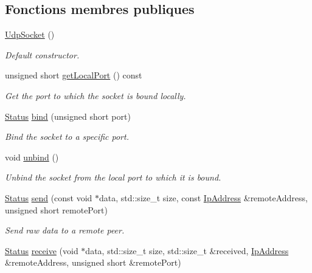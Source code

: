 \subsection*{Fonctions membres publiques}
\begin{DoxyCompactItemize}
\item 
\mbox{\label{classsf_1_1UdpSocket_abb10725e26dee9d3a8165fe87ffb71bb}} 
\hyperlink{classsf_1_1UdpSocket_abb10725e26dee9d3a8165fe87ffb71bb}{Udp\+Socket} ()
\begin{DoxyCompactList}\small\item\em Default constructor. \end{DoxyCompactList}\item 
unsigned short \hyperlink{classsf_1_1UdpSocket_a5c03644b3da34bb763bce93e758c938e}{get\+Local\+Port} () const
\begin{DoxyCompactList}\small\item\em Get the port to which the socket is bound locally. \end{DoxyCompactList}\item 
\hyperlink{classsf_1_1Socket_a51bf0fd51057b98a10fbb866246176dc}{Status} \hyperlink{classsf_1_1UdpSocket_ab0bf8d32849836f92beb2fd734565481}{bind} (unsigned short port)
\begin{DoxyCompactList}\small\item\em Bind the socket to a specific port. \end{DoxyCompactList}\item 
void \hyperlink{classsf_1_1UdpSocket_a2c4abb8102a1bd31f51fcfe7f15427a3}{unbind} ()
\begin{DoxyCompactList}\small\item\em Unbind the socket from the local port to which it is bound. \end{DoxyCompactList}\item 
\hyperlink{classsf_1_1Socket_a51bf0fd51057b98a10fbb866246176dc}{Status} \hyperlink{classsf_1_1UdpSocket_a664ab8f26f37c21cc4de1b847c2efcca}{send} (const void $\ast$data, std\+::size\+\_\+t size, const \hyperlink{classsf_1_1IpAddress}{Ip\+Address} \&remote\+Address, unsigned short remote\+Port)
\begin{DoxyCompactList}\small\item\em Send raw data to a remote peer. \end{DoxyCompactList}\item 
\hyperlink{classsf_1_1Socket_a51bf0fd51057b98a10fbb866246176dc}{Status} \hyperlink{classsf_1_1UdpSocket_ade9ca0f7ed7919136917b0b997a9833a}{receive} (void $\ast$data, std\+::size\+\_\+t size, std\+::size\+\_\+t \&received, \hyperlink{classsf_1_1IpAddress}{Ip\+Address} \&remote\+Address, unsigned short \&remote\+Port)

\end{DoxyCompactItemize}
